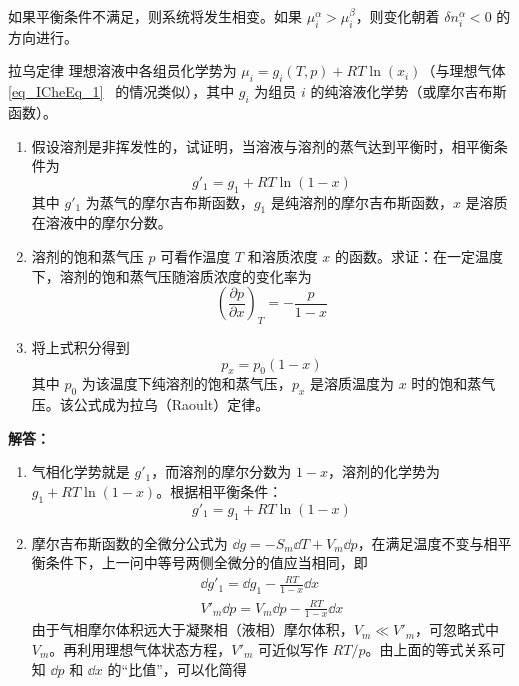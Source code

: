 如果平衡条件不满足，则系统将发生相变。如果 $\mu_i^\alpha>\mu_i^\beta$，则变化朝着 $\delta n_i^\alpha<0$ 的方向进行。

\begin{example}{拉乌定律}
理想溶液中各组员化学势为 $\mu_i=g_i(T,p)+RT\ln(x_i)$（与理想气体 \autoref{eq_ICheEq_1}~ 的情况类似），其中 $g_i$ 为组员 $i$ 的纯溶液化学势（或摩尔吉布斯函数）。
\begin{enumerate}
\item 假设溶剂是非挥发性的，试证明，当溶液与溶剂的蒸气达到平衡时，相平衡条件为
\begin{equation}
g'_1=g_1+RT\ln(1-x)
\end{equation}
其中 $g'_1$ 为蒸气的摩尔吉布斯函数，$g_1$ 是纯溶剂的摩尔吉布斯函数，$x$ 是溶质在溶液中的摩尔分数。
\item 溶剂的饱和蒸气压 $p$ 可看作温度 $T$ 和溶质浓度 $x$ 的函数。求证：在一定温度下，溶剂的饱和蒸气压随溶质浓度的变化率为
\begin{equation}
\left(\frac{\partial p}{\partial x}\right)_T=-\frac{p}{1-x}
\end{equation}
\item 将上式积分得到
\begin{equation}
p_x=p_0(1-x)
\end{equation}
其中 $p_0$ 为该温度下纯溶剂的饱和蒸气压，$p_x$ 是溶质温度为 $x$ 时的饱和蒸气压。该公式成为拉乌（Raoult）定律。
\end{enumerate}
\textbf{解答：}
\begin{enumerate}
\item 气相化学势就是 $g'_1$，而溶剂的摩尔分数为 $1-x$，溶剂的化学势为$g_1+RT\ln(1-x)$。根据相平衡条件：
\begin{equation}
g'_1=g_1+RT\ln(1-x)
\end{equation}
\item 摩尔吉布斯函数的全微分公式为 $\dd g=-S_m\dd T+V_m\dd p$，在满足温度不变与相平衡条件下，上一问中等号两侧全微分的值应当相同，即
\begin{equation}
\begin{aligned}
\dd g'_1=\dd g_1-\frac{RT}{1-x}\dd x\\
V'_m\dd p=V_m\dd p-\frac{RT}{1-x}\dd x
\end{aligned}
\end{equation}
由于气相摩尔体积远大于凝聚相（液相）摩尔体积，$V_m\ll V'_m$，可忽略式中 $V_m$。再利用理想气体状态方程，$V'_m$ 可近似写作 $RT/p$。由上面的等式关系可知 $\dd p$ 和 $\dd x$ 的“比值”，可以化简得
\begin{equation}

\end{equation}
\end{enumerate}
\end{example}
